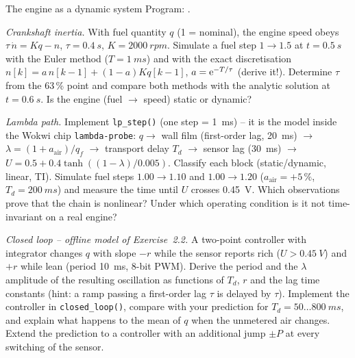 \begin{exercise}{The engine as a dynamic system}{\JSLinux}
Program: .
\begin{tasks}
  \item \emph{Crankshaft inertia.} With fuel quantity $q$ (1 = nominal), the
    engine speed obeys $\tau\,\dot n=K q-n$, $\tau=\SI{0.4}{s}$,
    $K=\SI{2000}{rpm}$. Simulate a fuel step $1\to1.5$ at $t=\SI{0.5}{s}$ with
    the Euler method ($T=\SI{1}{ms}$) and with the exact discretisation
    $n[k]=a\,n[k-1]+(1-a)Kq[k-1]$, $a=\mathrm{e}^{-T/\tau}$ (derive it!). Determine $\tau$
    from the 63\,\% point and compare both methods with the analytic solution
    at $t=\SI{0.6}{s}$. Is the engine (fuel $\to$ speed) static or dynamic?
  \item \emph{Lambda path.} Implement \texttt{lp\_step()} (one step = \SI{1}{ms}) --
    it is the model inside the Wokwi chip \texttt{lambda-probe}:
    $q\to$ wall film (first-order lag, \SI{20}{ms}) $\to$
    $\lambda=(1+a_{\text{air}})/q_f$ $\to$ transport delay $T_d$ $\to$ sensor
    lag (\SI{30}{ms}) $\to$ $U=0.5+0.4\tanh((1-\lambda)/0.005)$.
    Classify each block (static/dynamic, linear, TI). Simulate fuel steps
    $1.00\to1.10$ and $1.00\to1.20$ ($a_{\text{air}}=+5\,\%$, $T_d=\SI{200}{ms}$)
    and measure the time until $U$ crosses \SI{0.45}{V}. Which observations prove
    that the chain is nonlinear? Under which operating condition is it not
    time-invariant on a real engine?
  \item \emph{Closed loop -- offline model of Exercise~2.2.} A two-point controller
    with integrator changes $q$ with slope $-r$ while the sensor reports rich
    ($U>\SI{0.45}{V}$) and $+r$ while lean (period \SI{10}{ms}, 8-bit PWM).
    Derive the period and the $\lambda$ amplitude of the resulting oscillation as
    functions of $T_d$, $r$ and the lag time constants (hint: a ramp passing a
    first-order lag $\tau$ is delayed by $\tau$). Implement the controller in
    \texttt{closed\_loop()}, compare with your prediction for
    $T_d=50\dots\SI{800}{ms}$, and explain what happens to the mean of $q$ when
    the unmetered air changes. Extend the prediction to a controller with an
    additional jump $\pm P$ at every switching of the sensor.
\end{tasks}
\end{exercise}

